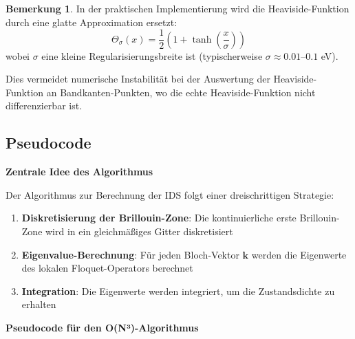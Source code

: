 \documentclass[a4paper,12pt]{article}
\theoremstyle{definition}
\newtheorem{bemerkung}{Bemerkung}[section]
\begin{document}
\begin{bemerkung}
	In der praktischen Implementierung wird die Heaviside-Funktion durch eine glatte Approximation ersetzt:
	\[
	\Theta_\sigma(x) = \frac{1}{2} \left(1 + \tanh\left(\frac{x}{\sigma}\right)\right)
	\]
	wobei $\sigma$ eine kleine Regularisierungsbreite ist (typischerweise $\sigma \approx 0.01$--$0.1$ eV).
	
	Dies vermeidet numerische Instabilität bei der Auswertung der Heaviside-Funktion an Bandkanten-Punkten, wo die echte Heaviside-Funktion nicht differenzierbar ist.
\end{bemerkung}

\subsection{Pseudocode}

\textbf{Zentrale Idee des Algorithmus}
 
Der Algorithmus zur Berechnung der IDS folgt einer dreischrittigen Strategie:
 
\begin{enumerate}
	\item \textbf{Diskretisierung der Brillouin-Zone}: Die kontinuierliche erste Brillouin-Zone wird in ein gleichmäßiges Gitter diskretisiert
	\item \textbf{Eigenvalue-Berechnung}: Für jeden Bloch-Vektor $\mathbf{k}$ werden die Eigenwerte des lokalen Floquet-Operators berechnet
	\item \textbf{Integration}: Die Eigenwerte werden integriert, um die Zustandsdichte zu erhalten
\end{enumerate}
 
\textbf{Pseudocode für den O(N³)-Algorithmus}
 
\end{document}
